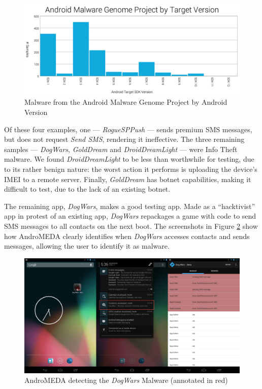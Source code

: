 \begin{figure}[h]
\begin{center}
\includegraphics[width=1.0\columnwidth]{figs/MalwareAndSDK}
\caption{Malware from the Android Malware Genome Project by Android Version }
\label{fig:malwaresdk}
\end{center}
\end{figure}

Of these four examples, one --- \textit{RogueSPPush} --- sends premium SMS messages, but does not request \textit{Send SMS}, rendering it ineffective. The three remaining samples --- \textit{DogWars}, \textit{GoldDream} and \textit{DroidDreamLight} --- were Info Theft malware. We found \textit{DroidDreamLight} to be less than worthwhile for testing, due to its rather benign nature: the worst action it performs is uploading the device's IMEI to a remote server. Finally, \textit{GoldDream} has botnet capabilities, making it difficult to test, due to the lack of an existing botnet.

The remaining app, \textit{DogWars}, makes a good testing app. Made as a ``hacktivist'' app in protest of an existing app\citep{symantecdogwars}, \textit{DogWars} repackages a game with code to send SMS messages to all contacts on the next boot. The screenshots in Figure \ref{fig:dogwars_visual} show how AndroMEDA clearly identifies when \textit{DogWars} accesses contacts and sends messages, allowing the user to identify it as malware.

\begin{figure}[h]
\begin{center}
\includegraphics[width=1.0\columnwidth]{figs/dogwars_detection}
\caption{AndroMEDA detecting the \textit{DogWars} Malware (annotated in red) }
\label{fig:dogwars_visual}
\end{center}
\end{figure}

